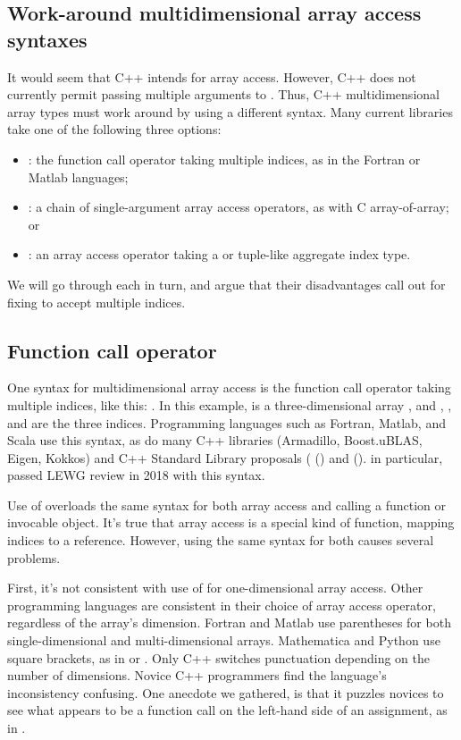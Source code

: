 \documentclass{wg21}
\begin{document}
\subsection{Work-around multidimensional array access syntaxes}

It would seem that C++ intends  for array access.  However, C++ does not currently permit passing multiple arguments to .  Thus, C++ multidimensional array types must work around by using a different syntax.  Many current libraries take one of the following three options:

\begin{itemize}
\item {}: the function call operator taking multiple indices, as in the Fortran or Matlab languages;
\item {}: a chain of single-argument array access operators, as with C array-of-array; or
\item {}: an array access operator taking a  or tuple-like aggregate index type.
\end{itemize}

We will go through each in turn, and argue that their disadvantages call out for fixing  to accept multiple indices.

\subsection{Function call operator}

One syntax for multidimensional array access is the function call operator taking multiple indices, like this: .  In this example,  is a three-dimensional array , and , , and  are the three indices.  Programming languages such as Fortran, Matlab, and Scala use this syntax, as do many C++ libraries (Armadillo, Boost.uBLAS, Eigen, Kokkos) and C++ Standard Library proposals ( () and  ().   in particular, passed LEWG review in 2018 with this syntax.

Use of  overloads the same syntax for both array access and calling a function or invocable object.  It's true that array access is a special kind of function, mapping indices to a reference.  However, using the same syntax for both causes several problems.

First, it's not consistent with use of  for one-dimensional array access.  Other programming languages are consistent in their choice of array access operator, regardless of the array's dimension.  Fortran and Matlab use parentheses for both single-dimensional and multi-dimensional arrays.  Mathematica and Python use square brackets, as in  or .  Only C++ switches punctuation depending on the number of dimensions.  Novice C++ programmers find the language's inconsistency confusing.  One anecdote we gathered, is that it puzzles novices to see what appears to be a function call on the left-hand side of an assignment, as in .
\end{document}

